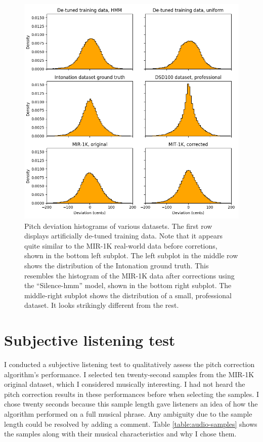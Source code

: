 \begin{figure}[t]
    \centering
    \includegraphics[width=\columnwidth]{figures/dataset-comparison.png}
    \caption{Pitch deviation histograms of various datasets. The first row displays artificially de-tuned training data. Note that it appears quite similar to the MIR-1K real-world data before corretions, shown in the bottom left subplot. The left subplot in the middle row shows the distribution of the Intonation ground truth. This resembles the histogram of the MIR-1K data after corrections using the ``Silence-\gls{hmm}'' model, shown in the bottom right subplot. The middle-right subplot shows the distribution of a small, professional dataset. It looks strikingly different from the rest.}
    \label{fig:dataset-comparison}
\end{figure}



\section{Subjective listening test}
\label{sec:subjective-test}
I conducted a subjective listening test to qualitatively assess the pitch correction algorithm's performance. I selected ten twenty-second samples from the MIR-1K original dataset, which I considered musically interesting. I had not heard the pitch correction results in these performances before when selecting the samples. I chose twenty seconds because this sample length gave listeners an idea of how the algorithm performed on a full musical phrase. Any ambiguity due to the sample length could be resolved by adding a comment. Table \ref{table:audio-samples} shows the samples along with their musical characteristics and why I chose them. 


